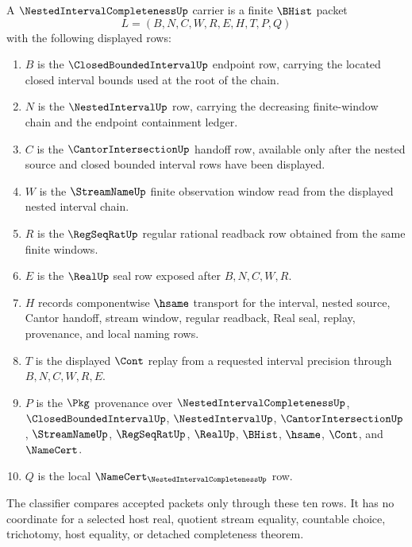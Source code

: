 \begin{definition}
\label{def:nested-interval-completeness-carrier}
A $\NestedIntervalCompletenessUp$ carrier is a finite $\BHist$ packet
$$
L=(B,N,C,W,R,E,H,T,P,Q)
$$
with the following displayed rows:
\begin{enumerate}
\item $B$ is the $\ClosedBoundedIntervalUp$ endpoint row, carrying the located closed interval bounds used at the root of the chain.
\item $N$ is the $\NestedIntervalUp$ row, carrying the decreasing finite-window chain and the endpoint containment ledger.
\item $C$ is the $\CantorIntersectionUp$ handoff row, available only after the nested source and closed bounded interval rows have been displayed.
\item $W$ is the $\StreamNameUp$ finite observation window read from the displayed nested interval chain.
\item $R$ is the $\RegSeqRatUp$ regular rational readback row obtained from the same finite windows.
\item $E$ is the $\RealUp$ seal row exposed after $B,N,C,W,R$.
\item $H$ records componentwise $\hsame$ transport for the interval, nested source, Cantor handoff, stream window, regular readback, Real seal, replay, provenance, and local naming rows.
\item $T$ is the displayed $\Cont$ replay from a requested interval precision through $B,N,C,W,R,E$.
\item $P$ is the $\Pkg$ provenance over $\NestedIntervalCompletenessUp$, $\ClosedBoundedIntervalUp$, $\NestedIntervalUp$, $\CantorIntersectionUp$, $\StreamNameUp$, $\RegSeqRatUp$, $\RealUp$, $\BHist$, $\hsame$, $\Cont$, and $\NameCert$.
\item $Q$ is the local $\NameCert_{\NestedIntervalCompletenessUp}$ row.
\end{enumerate}
The classifier compares accepted packets only through these ten rows. It has no coordinate for a selected host real, quotient stream equality, countable choice, trichotomy, host equality, or detached completeness theorem.
\end{definition}
